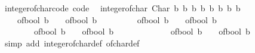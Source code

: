 \begin{isabellebody}
\ integer{\isacharunderscore}{\kern0pt}of{\isacharunderscore}{\kern0pt}char{\isacharunderscore}{\kern0pt}code\ {\isacharbrackleft}{\kern0pt}code{\isacharbrackright}{\kern0pt}{\isacharcolon}{\kern0pt}\isanewline
\ \ {\isachardoublequoteopen}integer{\isacharunderscore}{\kern0pt}of{\isacharunderscore}{\kern0pt}char\ {\isacharparenleft}{\kern0pt}Char\ b{}\ b{}\ b{}\ b{}\ b{}\ b{}\ b{}\ b{}{\isacharparenright}{\kern0pt}\ {\isacharequal}{\kern0pt}\isanewline
\ \ \ \ {\isacharparenleft}{\kern0pt}{\isacharparenleft}{\kern0pt}{\isacharparenleft}{\kern0pt}{\isacharparenleft}{\kern0pt}{\isacharparenleft}{\kern0pt}{\isacharparenleft}{\kern0pt}of{\isacharunderscore}{\kern0pt}bool\ b{}\ {\isacharasterisk}{\kern0pt}\ {}\ {\isacharplus}{\kern0pt}\ of{\isacharunderscore}{\kern0pt}bool\ b{}{\isacharparenright}{\kern0pt}\ {\isacharasterisk}{\kern0pt}\ {}\ {\isacharplus}{\kern0pt}\isanewline
\ \ \ \ \ \ of{\isacharunderscore}{\kern0pt}bool\ b{}{\isacharparenright}{\kern0pt}\ {\isacharasterisk}{\kern0pt}\ {}\ {\isacharplus}{\kern0pt}\ of{\isacharunderscore}{\kern0pt}bool\ b{}{\isacharparenright}{\kern0pt}\ {\isacharasterisk}{\kern0pt}\ {}\ {\isacharplus}{\kern0pt}\isanewline
\ \ \ \ \ \ \ \ of{\isacharunderscore}{\kern0pt}bool\ b{}{\isacharparenright}{\kern0pt}\ {\isacharasterisk}{\kern0pt}\ {}\ {\isacharplus}{\kern0pt}\ of{\isacharunderscore}{\kern0pt}bool\ b{}{\isacharparenright}{\kern0pt}\ {\isacharasterisk}{\kern0pt}\ {}\ {\isacharplus}{\kern0pt}\isanewline
\ \ \ \ \ \ \ \ \ \ of{\isacharunderscore}{\kern0pt}bool\ b{}{\isacharparenright}{\kern0pt}\ {\isacharasterisk}{\kern0pt}\ {}\ {\isacharplus}{\kern0pt}\ of{\isacharunderscore}{\kern0pt}bool\ b{}{\isachardoublequoteclose}\isanewline
%
\isadelimproof
\ \ %
\endisadelimproof
%
\isatagproof
{}\isamarkupfalse%
\ {\isacharparenleft}{\kern0pt}simp\ add{\isacharcolon}{\kern0pt}\ integer{\isacharunderscore}{\kern0pt}of{\isacharunderscore}{\kern0pt}char{\isacharunderscore}{\kern0pt}def\ of{\isacharunderscore}{\kern0pt}char{\isacharunderscore}{\kern0pt}def{\isacharparenright}{\kern0pt}%
\endisatagproof
{\isafoldproof}%
%
\isadelimproof
%
\endisadelimproof
%
\isadelimdocument
%
\endisadelimdocument
%
\isatagdocument
%
\isamarkuptrue%
%
\end{isabellebody}
